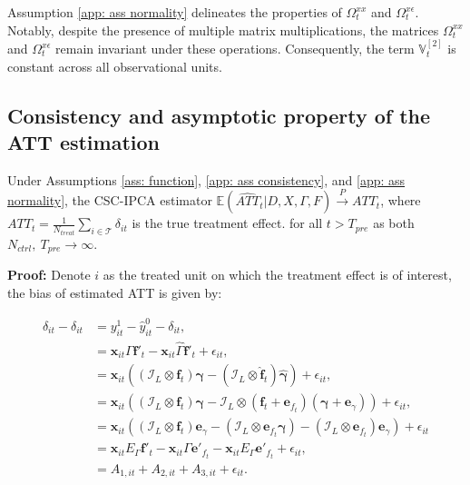 \documentclass[12pt]{article}
\begin{document}
Assumption \ref{app: ass normality} delineates the properties of $\Omega_t^{xx}$ and $\Omega_t^{x\epsilon}$. Notably, despite the presence of multiple matrix multiplications, the matrices $\Omega_t^{xx}$ and $\Omega_t^{x\epsilon}$ remain invariant under these operations. Consequently, the term $\mathbb{V}_t^{[2]}$ is constant across all observational units.

\subsection{Consistency and asymptotic property of the ATT estimation}
\begin{theorem}
\label{thm: bias}
Under Assumptions \ref{ass: function}, \ref{app: ass consistency}, and \ref{app: ass normality}, the CSC-IPCA estimator $\mathbb{E}\left(\widehat{ATT}_{t} | D, X, \Gamma, F\right) \xrightarrow{P} ATT_{t}$, where $ATT_{t} = \frac{1}{N_{treat}}\sum_{i \in \mathcal{T}}\delta_{it}$ is the true treatment effect. for all $t > T_{pre}$ as both $N_{ctrl}, \ T_{pre} \to \infty$.
\end{theorem}

\textbf{Proof:} Denote $i$ as the treated unit on which the treatment effect is of interest, the bias of estimated ATT is given by:

\begin{equation*}
\begin{aligned}
\hat{\delta}_{it} - \delta_{it} &= y_{it}^1 - \hat{y}_{it}^0 - \delta_{it}, \\    
&= \textbf{x}_{it}\Gamma \bm{f}'_t - \textbf{x}_{it}\hat{\Gamma}\hat{\bm{f}}'_t + \epsilon_{it}, \\
&= \textbf{x}_{it}\left( \left(\mathcal{I}_L\otimes \bm{f}_t \right) \bm{\gamma} - (\mathcal{I}_L\otimes \hat{\bm{f}}_t ) \hat{\bm{\gamma}} \right) + \epsilon_{it}, \\
&= \textbf{x}_{it}\left( \left(\mathcal{I}_L\otimes \bm{f}_t \right) \bm{\gamma} - \mathcal{I}_L\otimes (\bm{f}_t + \bm{e}_{f_t}) (\bm{\gamma}+\textbf{e}_{\gamma}) \right) + \epsilon_{it}, \\
&= \textbf{x}_{it}\left( (\mathcal{I}_L \otimes \bm{f}_t) \textbf{e}_{\gamma} - (\mathcal{I}_L \otimes \bm{e}_{f_t} \bm{\gamma}) - (\mathcal{I}_L \otimes \bm{e}_{f_t}) \textbf{e}_{\gamma} \right) + \epsilon_{it}\\
&= \textbf{x}_{it}E_{\Gamma}\bm{f}'_t - \textbf{x}_{it}\Gamma \bm{e}'_{f_t} - \textbf{x}_{it}E_{\Gamma}\bm{e}'_{f_t} + \epsilon_{it}, \\
&= A_{1,it} + A_{2,it} + A_{3,it} + \epsilon_{it}.
\end{aligned}
\end{equation*}
\end{document}
